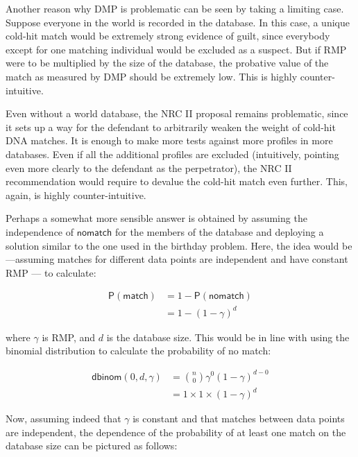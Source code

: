 \documentclass[10pt,dvipsnames,enabledeprecatedfontcommands]{scrartcl}
\newcommand{\pr}[1]{\mathsf{P}(#1)}
\begin{document}
Another reason why DMP is problematic can be seen by taking a limiting
case. Suppose everyone in the world is recorded in the database. In this
case, a unique cold-hit match would be extremely strong evidence of
guilt, since everybody except for one matching individual would be
excluded as a suspect. But if RMP were to be multiplied by the size of
the database, the probative value of the match as measured by DMP should
be extremely low. This is highly counter-intuitive.

Even without a world database, the NRC II proposal remains problematic,
since it sets up a way for the defendant to arbitrarily weaken the
weight of cold-hit DNA matches. It is enough to make more tests against
more profiles in more databases. Even if all the additional profiles are
excluded (intuitively, pointing even more clearly to the defendant as
the perpetrator), the NRC II recommendation would require to devalue the
cold-hit match even further. This, again, is highly counter-intuitive.

Perhaps a somewhat more sensible answer is obtained by assuming the
independence of \(\mathsf{no match}\) for the members of the database
and deploying a solution similar to the one used in the birthday
problem. Here, the idea would be---assuming matches for different data
points are independent and have constant RMP --- to calculate:

\begin{align*}
\pr{\mathsf{match}} & = 1 - \pr{\mathsf{no match}}\\
& = 1 - (1-\gamma)^d
\end{align*}

\noindent where \(\gamma\) is RMP, and \(d\) is the database size. This
would be in line with using the binomial distribution to calculate the
probability of no match:

\begin{align*}
\mathsf{dbinom}(0,d,\gamma) & = {n \choose 0} \gamma^0 (1-\gamma)^{d-0}\\
& = 1 \times 1 \times (1-\gamma)^d
\end{align*}

Now, assuming indeed that \(\gamma\) is constant and that matches
between data points are independent, the dependence of the probability
of at least one match on the database size can be pictured as follows:
\end{document}
